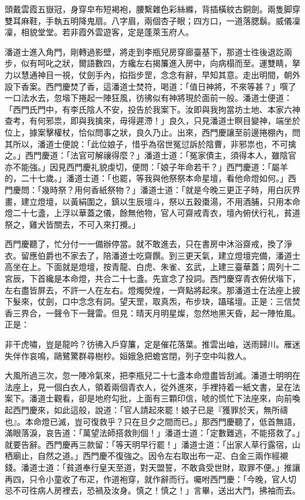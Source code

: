 \begin{myquote}
頭戴雲霞五嶽冠，身穿皁布短褐袍，腰繫雜色彩絲縧，背插橫紋古銅劍。兩隻脚穿雙耳麻鞋，手執五明降鬼扇。八字眉，兩個杏子眼；四方口，一道落腮鬍。威儀凜凜，相貌堂堂。若非霞外雲遊客，定是蓬萊玉府人。
\end{myquote}

潘道士進入角門，剛轉過影壁，將走到李瓶兒房穿廊臺基下，那道士徃後退訖兩步，似有呵叱之狀，爾語數四，方纔左右揭簾進入房中，向病榻而至。運雙睛，拏力以慧通神目一視，仗劍手內，掐指步罡，念念有辭，早知其意。{}走出明間，朝外設下香案。西門慶焚了香，這潘道士焚符，喝道：「值日神將，不來等甚？」噀了一口法水去，忽堦下捲起一陣狂風，彷彿似有神將現於面前一般。潘道士便道：「西門氏門中，有李氏陰人不安，投告於我案下。汝即與我拘當坊土地、本家六神查考，有何邪祟，即與我擒來，毋得遲滯！」良久，只見潘道士瞑目變神，端坐於位上，據案擊權杖，恰似問事之狀，{}良久乃止。出來，西門慶讓至前邊捲棚內，問其所以，潘道士便說：「此位娘子，惜乎為宿世冤愆訴於陰曹，非邪祟也，不可擒之。」西門慶道：「法官可解禳得麼？」潘道士道：「冤家債主，須得本人，雖陰官亦不能強。」{}因見西門慶礼貌虔切，便問：「娘子年命若干？」西門慶道：「屬羊的，二十七歲。」潘道士道：「也罷，等我與他祭祭本命星壇，看他命燈如何。」西門慶問：「幾時祭？用何香紙祭物？」潘道士道：「就是今晚三更正子時，用白灰界畫，建立燈壇，以黃絹圍之，鎮以生辰壇斗，祭以五穀棗湯，不用酒脯，只用本命燈二十七盞，上浮以華蓋之儀，餘無他物，官人可齋戒青衣，壇內俯伏行礼，貧道祭之，雞犬皆關去，不可入來打攪。」

西門慶聽了，忙分付一一備辦停當。就不敢進去，只在書房中沐浴齋戒，換了淨衣。留應伯爵也不家去了，陪潘道士吃齋饌。到三更天氣，建立燈壇完備，潘道士高坐在上。下面就是燈壇，按青龍、白虎、朱雀、玄武，上建三臺華蓋；周列十二宮辰，下首纔是本命燈，共合二十七盞。先宣念了投詞。西門慶穿青衣俯伏堦下，左右盡皆屏去，不許一人在左右。燈燭熒煌，一齊點將起來。那潘道士在法座上披下髮來，仗劍，口中念念有詞。望天罡，取真炁，布步玦，躡瑤壇。正是：三信焚香三界合，一聲令下一聲雷。但見：晴天月明星燦，忽然地黑天昏，起一陣恠風。正是：

\begin{myquote}
非干虎嘯，豈是龍吟？彷彿入戶穿簾，定是催花落葉。推雲出岫，送雨歸川。雁迷失伴作哀鳴，鷗鷺驚群尋樹杪。姮娥急把蟾宮閉，列子空中叫救人。
\end{myquote}

大風所過三次，忽一陣冷氣來，把李瓶兒二十七盞本命燈盡皆刮滅。潘道士明明在法座上，見一個白衣人，領着兩個青衣人，從外進來，手裡持着一紙文書，呈在法案下。潘道士觀看，卻是地府勾批，上面有三顆印信，唬的慌忙下法座來，向前喚起西門慶來，如此這般，說道：「官人請起來罷！娘子已是『獲罪於天，無所禱也』。本命燈已滅，豈可復救乎？只在旦夕之間而已。」那西門慶聽了，低首無語，滿眼落淚，哀告道：「萬望法師搭救則個！」{}潘道士道：「定數難逃，不能搭救了。」就要告辭。西門慶再三款留：「等天明早行罷！」潘道士道：「出家人草行露宿，山栖廟止，自然之道。」西門慶不復強之。因令左右取出布一疋、白金三兩作經襯錢。潘道士道：「貧道奉行皇天至道，對天盟誓，不敢貪受世財，取罪不便。」推讓再四，只令小童收了布疋，作道袍穿，就作辭而行。囑咐西門慶：「今晚，官人切忌不可徃病人房裡去，恐禍及汝身。慎之！慎之！」言畢，送出大門，拂袖而去。

